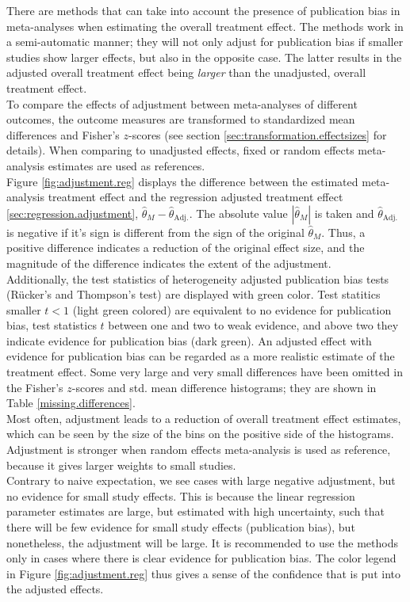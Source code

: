 \documentclass[11pt,a4paper,twoside]{book}\usepackage[]{graphicx}\usepackage[]{color}
\begin{document}
There are methods that can take into account the presence of publication bias in meta-analyses when estimating the overall treatment effect. The methods work in a semi-automatic manner; they will not only adjust for publication bias if smaller studies show larger effects, but also in the opposite case. The latter results in the adjusted overall treatment effect being \textit{larger} than the unadjusted, overall treatment effect. \\
To compare the effects of adjustment between meta-analyses of different outcomes, the outcome measures are transformed to standardized mean differences and Fisher's $z$-scores (see section \ref{sec:transformation.effectsizes} for details). When comparing to unadjusted effects, fixed or random effects meta-analysis estimates are used as references.\\
Figure \ref{fig:adjustment.reg} displays the difference between the estimated meta-analysis treatment effect and the regression adjusted treatment effect \ref{sec:regression.adjustment}, $\hat{\theta}_M - \hat{\theta}_\textrm{Adj.}$. The absolute value $|\hat{\theta}_M|$ is taken and $\hat{\theta}_\textrm{Adj.}$ is negative if it's sign is different from the sign of the original $\hat{\theta}_M$. Thus, a positive difference indicates a reduction of the original effect size, and the magnitude of the difference indicates the extent of the adjustment. \\
Additionally, the test statistics of heterogeneity adjusted publication bias tests (R\"ucker's and Thompson's test) are displayed with green color. Test statitics smaller $t < 1$ (light green colored) are equivalent to no evidence for publication bias, test statistics $t$ between one and two to weak evidence, and above two they indicate evidence for publication bias (dark green). An adjusted effect with evidence for publication bias can be regarded as a more realistic estimate of the treatment effect. Some very large and very small differences have been omitted in the Fisher's $z$-scores and std. mean difference histograms; they are shown in Table \ref{missing.differences}. \\
Most often, adjustment leads to a reduction of overall treatment effect estimates, which can be seen by the size of the bins on the positive side of the histograms. Adjustment is stronger when random effects meta-analysis is used as reference, because it gives larger weights to small studies.\\
Contrary to naive expectation, we see cases with large negative adjustment, but no evidence for small study effects. This is because the linear regression parameter estimates are large, but estimated with high uncertainty, such that there will be few evidence for small study effects (publication bias), but nonetheless, the adjustment will be large. It is recommended to use the methods only in cases where there is clear evidence for publication bias. The color legend in Figure \ref{fig:adjustment.reg} thus gives a sense of the confidence that is put into the adjusted effects. \\
\end{document}
